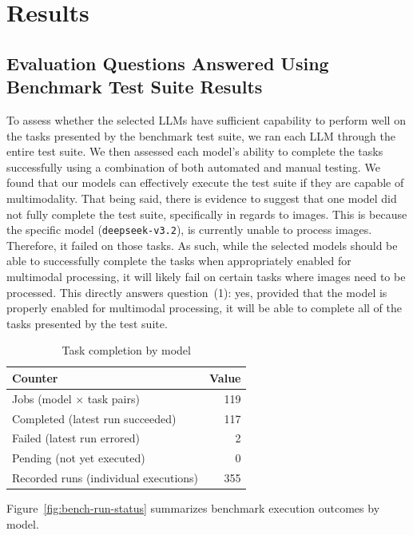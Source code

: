 \section{Results}

\subsection{Evaluation Questions Answered Using Benchmark Test Suite Results}
To assess whether the selected LLMs have sufficient capability to perform well on the tasks presented by the benchmark test suite, we ran each LLM through the entire test suite.
We then assessed each model's ability to complete the tasks successfully using a combination of both automated and manual testing.
We found that our models can effectively execute the test suite if they are capable of multimodality.
That being said, there is evidence to suggest that one model did not fully complete the test suite, specifically in regards to images.
This is because the specific model (\texttt{deepseek-v3.2}), is currently unable to process images.
Therefore, it failed on those tasks.
As such, while the selected models should be able to successfully complete the tasks when appropriately enabled for multimodal processing, it will likely fail on certain tasks where images need to be processed.
This directly answers question~(1): yes, provided that the model is properly enabled for multimodal processing, it will be able to complete all of the tasks presented by the test suite.

\begin{table}[htb]
    \centering
    \caption{Task completion by model}
    \label{tab:task-completion}
    \begin{tabular}{lr}
        \hline
        \textbf{Counter} & \textbf{Value} \\
        \hline
        Jobs (model $\times$ task pairs) & 119 \\
        Completed (latest run succeeded) & 117 \\
        Failed (latest run errored) & 2 \\
        Pending (not yet executed) & 0 \\
        Recorded runs (individual executions) & 355 \\
        \hline
    \end{tabular}
\end{table}

Figure~\ref{fig:bench-run-status} summarizes benchmark execution outcomes by model.

